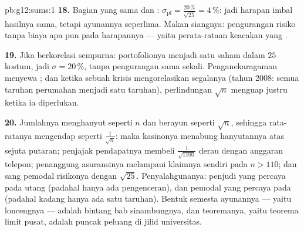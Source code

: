 \begin{solution}{pb:g12:sums:1}
\textbf{18.} Bagian yang sama dan : $\sigma_{\text{pf}} =
\frac{20\,\%}{\sqrt{25}} = 4\,\%$: jadi harapan imbal hasilnya sama,
tetapi ayunannya seperlima. Makan siangnya: pengurangan risiko tanpa
biaya apa pun pada harapannya --- yaitu perata-rataan keacakan yang .

\textbf{19.} Jika berkorelasi sempurna: portofolionya menjadi satu saham
dalam $25$ kostum, jadi $\sigma = 20\,\%$, tanpa pengurangan sama sekali.
Penganekaragaman menyewa \emph{}; dan ketika sebuah krisis
mengorelasikan segalanya (tahun 2008: semua taruhan perumahan menjadi satu taruhan),
perlindungan $\sqrt n$ menguap justru ketika ia
diperlukan.

\textbf{20.} Jumlahnya menghanyut seperti $n$ dan berayun seperti
$\sqrt n$, sehingga rata-ratanya mengendap seperti $\frac{1}{\sqrt n}$: maka
kasinonya menabung hanyutannya atas sejuta putaran; penjajak pendapatnya
membeli $\frac{1}{\sqrt{1100}}$ derau dengan anggaran telepon;
penanggung asuransinya melampaui klaimnya sendiri pada $n > 110$; dan sang
pemodal  risikonya dengan $\sqrt{25}$. Penyalahgunanya: penjudi
yang percaya pada utang (padahal hanya ada pengenceran), dan
pemodal yang percaya pada  (padahal kadang hanya ada
satu taruhan). Bentuk semesta ayunannya --- yaitu
loncengnya --- adalah bintang bab sinambungnya, dan teoremanya,
yaitu teorema limit pusat, adalah puncak peluang di jilid
universitas.

\end{solution}
